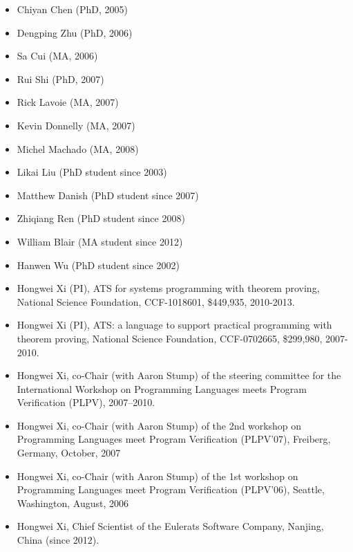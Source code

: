 \documentclass{article}
\begin{document}
\vspace{18pt}
\begin{itemize}
\item
Chiyan Chen (PhD, 2005)
\item
Dengping Zhu (PhD, 2006)
\item
Sa Cui (MA, 2006)
\item
Rui Shi (PhD, 2007)
\item
Rick Lavoie (MA, 2007)
\item
Kevin Donnelly (MA, 2007)
\item
Michel Machado (MA, 2008)
\item
Likai Liu (PhD student since 2003)
\item
Matthew Danish (PhD student since 2007)
\item
Zhiqiang Ren (PhD student since 2008)
\item
William Blair (MA student since 2012)
\item
Hanwen Wu (PhD student since 2002)
\end{itemize}

\vspace{18pt}
\begin{itemize}
\item
Hongwei Xi (PI), ATS for systems programming with
theorem proving, National Science Foundation, CCF-1018601, \$449,935, 2010-2013.

\item
Hongwei Xi (PI), ATS: a language to support practical programming with
theorem proving, National Science Foundation, CCF-0702665, \$299,980, 2007-2010.
\end{itemize}

\vspace{18pt}
\begin{itemize}
\item
Hongwei Xi,
co-Chair (with Aaron Stump) of the steering committee for the International
Workshop on Programming Languages meets Program Verification (PLPV),
2007--2010.
\item
Hongwei Xi,
co-Chair (with Aaron Stump) of
the 2nd workshop on Programming Languages meet Program Verification
(PLPV'07), Freiberg, Germany, October, 2007
\item
Hongwei Xi,
co-Chair (with Aaron Stump) of
the 1st workshop on Programming Languages meet Program Verification
(PLPV'06), Seattle, Washington, August, 2006
\end{itemize}

\vspace{18pt}
\begin{itemize}
\item
Hongwei Xi,
Chief Scientist of the Eulerats Software Company, Nanjing, China
(since 2012).
\end{itemize}
\end{document}
